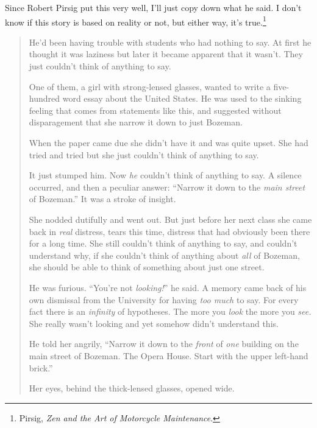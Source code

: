 \myendsectiontext


\bigskip


{
 Since Robert Pirsig put this very well, I'll just
copy down what he said. I don't know if this story is
based on reality or not, but either way, it's
true.\footnote{Pirsig, \textit{Zen and the Art of Motorcycle Maintenance}.}}

\begin{quotation}
{
 He'd been having trouble with students who had
nothing to say. At first he thought it was laziness but later it became
apparent that it wasn't. They just
couldn't think of anything to say.}

{
 One of them, a girl with strong-lensed glasses, wanted to write a
five-hundred word essay about the United States. He was used to the
sinking feeling that comes from statements like this, and suggested
without disparagement that she narrow it down to just Bozeman.}

{
 When the paper came due she didn't have it and was
quite upset. She had tried and tried but she just
couldn't think of anything to say.}

{
 It just stumped him. Now \textit{he} couldn't
think of anything to say. A silence occurred, and then a peculiar
answer: ``Narrow it down to the \textit{main street}
of Bozeman.'' It was a stroke of insight.}

{
 She nodded dutifully and went out. But just before her next class
she came back in \textit{real} distress, tears this time, distress that
had obviously been there for a long time. She still
couldn't think of anything to say, and
couldn't understand why, if she
couldn't think of anything about \textit{all} of
Bozeman, she should be able to think of something about just one
street.}

{
 He was furious. ``You're not
\textit{looking!}'' he said. A memory came back of
his own dismissal from the University for having \textit{too much} to
say. For every fact there is an \textit{infinity} of hypotheses. The
more you \textit{look} the more you \textit{see.} She really
wasn't looking and yet somehow didn't
understand this.}

{
 He told her angrily, ``Narrow it down to the
\textit{front} of \textit{one} building on the main street of Bozeman.
The Opera House. Start with the upper left-hand
brick.''}

{
 Her eyes, behind the thick-lensed glasses, opened wide.}


\end{quotation}
